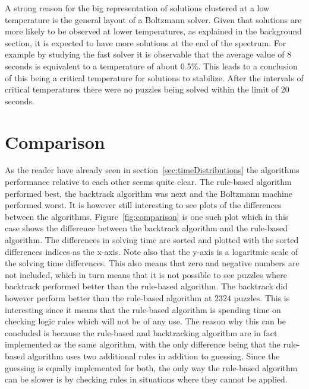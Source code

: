 \documentclass[a4paper,11pt]{kth-mag}
\begin{document}
A strong reason for the big representation of solutions clustered at a low temperature is the general layout of a Boltzmann solver.
Given that solutions are more likely to be observed at lower temperatures, as explained in the background section, it is expected to have more solutions at the end of the spectrum.
For example by studying the fast solver it is observable that the average value of 8 seconds is equivalent to a temperature of about 0.5\%.
This leads to a conclusion of this being a critical temperature for solutions to stabilize.
After the intervals of critical temperatures there were no puzzles being solved within the limit of 20 seconds.

\FloatBarrier
\section{Comparison}
\label{sec:comparisonAnalysis}
As the reader have already seen in section~\ref{sec:timeDistributions} the algorithms performance relative to each other seems quite clear.
The rule-based algorithm performed best, the backtrack algorithm was next and the Boltzmann machine performed worst.
It is however still interesting to see plots of the differences between the algorithms.
Figure~\ref{fig:comparison} is one such plot which in this case shows the difference between the backtrack algorithm and the rule-based algorithm. The differences in solving time are sorted and plotted with the sorted differences indices as the x-axis. Note also that the y-axis is a logaritmic scale of the solving time differences.
This also means that zero and negative numbers are not included, which in turn means that it is not possible to see puzzles where backtrack performed better than the rule-based algorithm.
The backtrack did however perform better than the rule-based algorithm at $2324$ puzzles.
This is interesting since it means that the rule-based algorithm is spending time on checking logic rules which will not be of any use.
The reason why this can be concluded is because the rule-based and backtracking algorithm are in fact implemented as the same algorithm, with the only difference being that the rule-based algorithm uses two additional rules in addition to guessing.
Since the guessing is equally implemented for both, the only way the rule-based algorithm can be slower is by checking rules in situations where they cannot be applied.
\\
\end{document}

